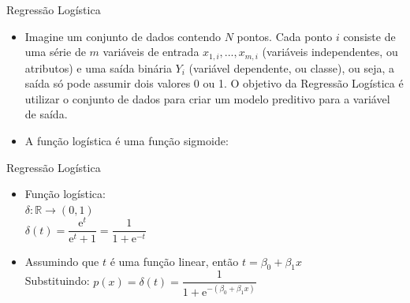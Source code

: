 \documentclass{libs/ufc_format}
\begin{document}
\begin{frame}{Regressão Logística}
    \begin{itemize}
        \justifying
        \item<1> Imagine um conjunto de dados contendo $N$ pontos. Cada ponto $i$ consiste de uma série de $m$ variáveis de entrada $x_{1,i}, ..., x_{m,i}$ (variáveis independentes, ou atributos) e uma saída binária $Y_{i}$ (variável dependente, ou classe), ou seja, a saída só pode assumir dois valores 0 ou 1. O objetivo da Regressão Logística é utilizar o conjunto de dados para criar um modelo preditivo para a variável de saída.
        \item<2> A função logística é uma função sigmoide:
    \end{itemize}
    \centering
\end{frame}

\begin{frame}{Regressão Logística}
    \begin{itemize}
        \item Função logística:\\
        $\delta: \mathbb{R} \rightarrow (0,1)$\\
        $\delta(t) = \dfrac{\mathrm{e}^{t}}{\mathrm{e}^{t} + 1} = \dfrac{1}{1 + \mathrm{e}^{-t}}$
        \item<2-> Assumindo que $t$ é uma função linear, então $t = \beta_{0} + \beta_{1}x$\\
        Substituindo: $p(x) = \delta(t) = \dfrac{1}{1 + \mathrm{e}^{-(\beta_{0} + \beta_{1}x)}}$
    \end{itemize}
\end{frame}
\end{document}
